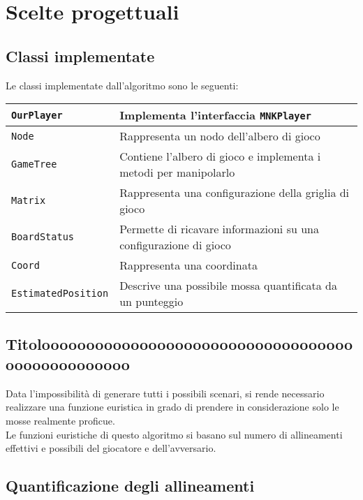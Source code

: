 \documentclass[11pt]{article}
\begin{document}
\section*{Scelte progettuali}
\subsection*{Classi implementate}
Le classi implementate dall'algoritmo sono le seguenti:
\begin{table}[H]	%
\centering			%
\def\arraystretch{1.5}
\begin{tabular}{|l|p{3in}|}	%
\hline	%
\texttt{OurPlayer} & Implementa l'interfaccia \texttt{MNKPlayer} \\ \hline
\texttt{Node} & Rappresenta un nodo dell'albero di gioco \\ \hline
\texttt{GameTree} & Contiene l'albero di gioco e implementa i metodi per manipolarlo \\ \hline
\texttt{Matrix} & Rappresenta una configurazione della griglia di gioco \\ \hline
\texttt{BoardStatus} & Permette di ricavare informazioni su una configurazione di gioco \\ \hline
\texttt{Coord} & Rappresenta una coordinata \\ \hline
\texttt{EstimatedPosition} & Descrive una possibile mossa quantificata da un punteggio \\ \hline
\end{tabular}
\end{table}

\subsection*{Titolooooooooooooooooooooooooooooooooooooooooooooooooo}
Data l'impossibilità di generare tutti i possibili scenari, si rende necessario realizzare una funzione euristica in grado di prendere in considerazione solo le mosse realmente proficue.\\
Le funzioni euristiche di questo algoritmo si basano sul numero di allineamenti effettivi e possibili del giocatore e dell'avversario.

\subsection*{Quantificazione degli allineamenti}
\end{document}
